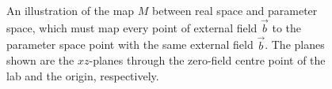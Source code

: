 \documentclass[aspectratio=169]{beamer}
\renewcommand{\va}{\vec}
\begin{document}
\begin{frame}
	\begin{figure}[h]
	        \centering
	        \caption{\centering An illustration of the map \(M\) between real space and parameter space,
	        which must map every point of external field \(\va{b}\) to the parameter space
	point with the same external field \(\va{b}\). The planes shown are the \(xz\)-planes
	through the zero-field centre point of the lab and the origin, respectively.}
	        \label{fig:fieldcompare}
	\end{figure}
\end{frame}
\end{document}
